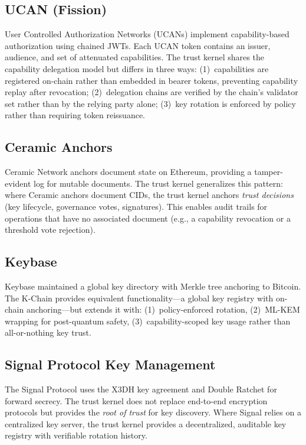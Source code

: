 \documentclass[11pt,a4paper]{article}
\begin{document}
\subsection{UCAN (Fission)}

User Controlled Authorization Networks (UCANs) \cite{ucan-fission} implement
capability-based authorization using chained JWTs. Each UCAN token contains
an issuer, audience, and set of attenuated capabilities. The trust kernel
shares the capability delegation model but differs in three ways:
(1)~capabilities are registered on-chain rather than embedded in bearer tokens,
preventing capability replay after revocation;
(2)~delegation chains are verified by the chain's validator set rather than
by the relying party alone;
(3)~key rotation is enforced by policy rather than requiring token reissuance.

\subsection{Ceramic Anchors}

Ceramic Network \cite{ceramic-anchors} anchors document state on Ethereum,
providing a tamper-evident log for mutable documents. The trust kernel
generalizes this pattern: where Ceramic anchors document CIDs, the trust
kernel anchors \emph{trust decisions} (key lifecycle, governance votes,
signatures). This enables audit trails for operations that have no associated
document (e.g., a capability revocation or a threshold vote rejection).

\subsection{Keybase}

Keybase \cite{keybase} maintained a global key directory with Merkle tree
anchoring to Bitcoin. The K-Chain provides equivalent functionality---a
global key registry with on-chain anchoring---but extends it with:
(1)~policy-enforced rotation,
(2)~ML-KEM wrapping for post-quantum safety,
(3)~capability-scoped key usage rather than all-or-nothing key trust.

\subsection{Signal Protocol Key Management}

The Signal Protocol \cite{signal-protocol} uses the X3DH key agreement and
Double Ratchet for forward secrecy. The trust kernel does not replace
end-to-end encryption protocols but provides the \emph{root of trust} for
key discovery. Where Signal relies on a centralized key server, the trust
kernel provides a decentralized, auditable key registry with verifiable
rotation history.
\end{document}
